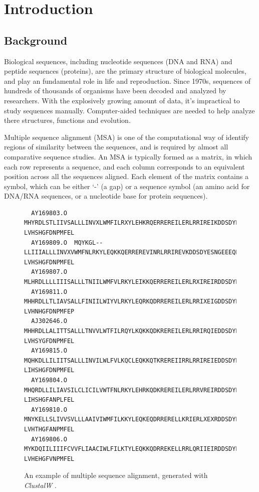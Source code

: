 \chapter{Introduction}\label{chap:Introduction}

\section{Background}

Biological sequences, including nucleotide sequences (DNA and RNA) and peptide sequences (proteins), are the primary structure of biological molecules, and play an fundamental role in life and reproduction. Since 1970s, sequences of hundreds of thousands of organisms have been decoded and analyzed by researchers. \cite{Benson:2007lr} With the explosively growing amount of data, it's impractical to study sequences manually. Computer-aided techniques are needed to help analyze there structures, functions and evolution.

Multiple sequence alignment (MSA) is one of the computational way of identify regions of similarity between the sequences, and is required by almost all comparative sequence studies. An MSA is typically formed as a matrix, in which each row represents a sequence, and each column corresponds to an equivalent position across all the sequences aligned. Each element of the matrix contains a symbol, which can be either `-' (a gap) or a sequence symbol (an amino acid for DNA/RNA sequences, or a nucleotide base for protein sequences). \cite{Edgar:2006aa}

\begin{figure}[hb]
\scriptsize
\begin{verbatim}
  AY169803.O  MHYRDLSTLIIVSALLLINVXLWMFILRXYLEHKRQERREREILERLRRIREIKDDSDYESNGEEEQEVMD-LVHSHGFDNPMFEL
  AY169809.O  MQYKGL--LLIIIALLLINVXVWMFNLRKYLEQKKQERREREVINRLRRIREVKDDSDYESNGEEEQEVME-LVHSHGFDNPMFEL
  AY169807.O  MLHRDLLLLIIISALLLTNIILWMFVLRKYLEIKKQERREREILERLRXIREIRDDSDYESNEEEEQEVRDHLVHTFGFANPMFEI
  AY169811.O  MHHRDLLTLIAVSALLFINIILWIYVLRKYLEQRKQDRREREILERLRRIXEIGDDSDYESNEEEEQEVMD-LVHNHGFDNPMFEP
  AJ302646.O  MHHRDLLALITTSALLLTNVVLWTFILRQYLKQKKQDKREREILERLRRIRQIEDDSDYESDGTEEQEVRD-LVHSYGFDNPMFEL
  AY169815.O  MQHKDLLILIITSALLLINVILWLFVLKQCLEQKKQTKREREIIRRLRRIREIEDDSDYESNGEEEQTVRD-LIHSHGFDNPMFEL
  AY169804.O  MHQRDLLILIAVSILCLICILVWTFNLRKYLEHRKQDKREREILERLRRVREIRDDSDYESBGEEEQEVMD-LIHSHGFANPLFEL
  AY169810.O  MNYKELLSLIVVSVLLLAAIVIWMFILKKYLEQKEQDRRERELLKRIERLXEXRDDSDYESNGDEEQEVMH-LVHTHGFANPMFEL
  AY169806.O  MYKDQIILIIIFCVVFLIAACIWLFILKTYLEQKKQDRREKELLRRLQRIIEIRDDSDYESNGEEEQEVMD-LVHEHGFVNPMFEL
\end{verbatim}
\caption[Example of Multiple Sequence Alignment]{An example of multiple sequence alignment, generated with \emph{ClustalW} \cite{Thompsonaa}.}\label{fig:msa}
\end{figure}

